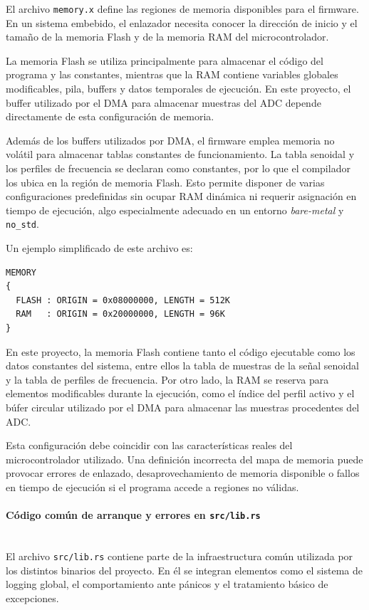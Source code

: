 \documentclass[11pt,a4paper]{article}
\newcommand{\myparagraph}[1]{\paragraph{#1}\mbox{}\\}
\begin{document}
El archivo \texttt{memory.x} define las regiones de memoria disponibles para el firmware. En un sistema embebido, el enlazador necesita conocer la dirección de inicio y el tamaño de la memoria Flash y de la memoria RAM del microcontrolador.

La memoria Flash se utiliza principalmente para almacenar el código del programa y las constantes, mientras que la RAM contiene variables globales modificables, pila, buffers y datos temporales de ejecución. En este proyecto, el buffer utilizado por el DMA para almacenar muestras del ADC depende directamente de esta configuración de memoria.

Además de los buffers utilizados por DMA, el firmware emplea memoria no volátil para almacenar tablas constantes de funcionamiento. La tabla senoidal y los perfiles de frecuencia se declaran como constantes, por lo que el compilador los ubica en la región de memoria Flash. Esto permite disponer de varias configuraciones predefinidas sin ocupar RAM dinámica ni requerir asignación en tiempo de ejecución, algo especialmente adecuado en un entorno \textit{bare-metal} y \texttt{no\_std}.

Un ejemplo simplificado de este archivo es:

\begin{lstlisting}
MEMORY
{
  FLASH : ORIGIN = 0x08000000, LENGTH = 512K
  RAM   : ORIGIN = 0x20000000, LENGTH = 96K
}
\end{lstlisting}

En este proyecto, la memoria Flash contiene tanto el código ejecutable como los datos constantes del sistema, entre ellos la tabla de muestras de la señal senoidal y la tabla de perfiles de frecuencia. Por otro lado, la RAM se reserva para elementos modificables durante la ejecución, como el índice del perfil activo y el búfer circular utilizado por el DMA para almacenar las muestras procedentes del ADC.

Esta configuración debe coincidir con las características reales del microcontrolador utilizado. Una definición incorrecta del mapa de memoria puede provocar errores de enlazado, desaprovechamiento de memoria disponible o fallos en tiempo de ejecución si el programa accede a regiones no válidas.



\myparagraph{Código común de arranque y errores en \texttt{src/lib.rs}}

El archivo \texttt{src/lib.rs} contiene parte de la infraestructura común utilizada por los distintos binarios del proyecto. En él se integran elementos como el sistema de logging global, el comportamiento ante pánicos y el tratamiento básico de excepciones.
\end{document}
